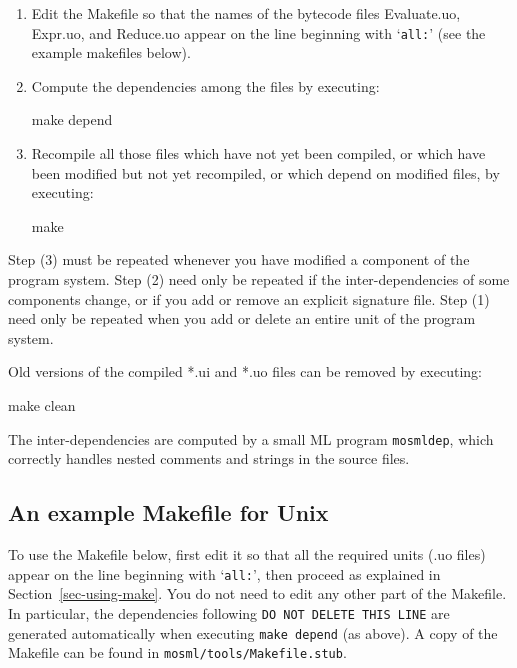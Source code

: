 \documentclass[fleqn]{article}
\begin{document}
\begin{enumerate}
\item Edit the Makefile so that the names of the bytecode files
  Evaluate.uo, Expr.uo, and Reduce.uo appear on the line beginning
  with `{\tt all:}' (see the example makefiles below).

\item Compute the dependencies among the files by executing:
\begin{program}
make depend
\end{program}

\item Recompile all those files which have not yet been compiled, or
  which have been modified but not yet recompiled, or which depend on
  modified files, by executing:
        
\begin{program}
make    
\end{program}
\end{enumerate}

\noindent Step (3) must be repeated whenever you have modified a
component of the program system.  Step (2) need only be repeated if
the inter-dependencies of some components change, or if you add or
remove an explicit signature file.  Step (1) need only be repeated
when you add or delete an entire unit of the program system.

Old versions of the compiled *.ui and *.uo files can be removed by
executing:

\begin{program}
make clean  
\end{program}

\noindent The inter-dependencies are computed by a small ML program
{\tt mosmldep}, which correctly handles nested comments and strings in
the source files.


\subsection{An example Makefile for Unix}
\label{sec-makefile-unix}

To use the Makefile below, first edit it so that all the required
units (.uo files) appear on the line beginning with `{\tt all:}', then
proceed as explained in Section~\ref{sec-using-make}.  You do not need
to edit any other part of the Makefile.  In particular, the
dependencies following {\tt DO NOT DELETE THIS LINE} are generated
automatically when executing {\tt make depend} (as above).  A copy of
the Makefile can be found in {\tt mosml/tools/Makefile.stub}.
\end{document}
